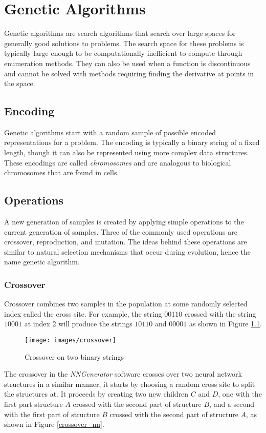 \chapter[Genetic Algorithms]{Genetic Algorithms}
Genetic algorithms are search algorithms that search over large spaces for generally good solutions to problems.
The search space for these problems is typically large enough to be computationally inefficient to compute through enumeration methods.
They can also be used when a function is discontinuous and cannot be solved with methods requiring finding the derivative at points in the space. 

\section{Encoding}
Genetic algorithms start with a random sample of possible encoded representations for a problem.
The encoding is typically a binary string of a fixed length, though it can also be represented using more complex data structures.
These encodings are called {\it chromosomes} and are analogous to biological chromosomes that are found in cells.

\section{Operations}
A new generation of samples is created by applying simple operations to the current generation of samples. 
Three of the commonly used operations are crossover, reproduction, and mutation.
The ideas behind these operations are similar to natural selection mechanisms that occur during evolution, hence the name genetic algorithm. 

\subsection{Crossover}
Crossover combines two samples in the population at some randomly selected index called the cross site. 
For example, the string $00110$ crossed with the string $10001$ at index 2 will produce the strings $10110$ and $00001$ as shown in Figure \ref{crossover}.

\begin{figure}[h!]
  \centering
  \texttt{[image: images/crossover]}
  \caption{Crossover on two binary strings}
  \label{crossover}
\end{figure}

The crossover in the {\it NNGenerator} software crosses over two
neural network structures in a similar manner, it starts by choosing a
random cross site to split the structures at.
It proceeds by creating two new children $C$ and $D$, one with the first part
structure $A$ crossed with the second part of structure $B$, and a
second with the first part of structure $B$ crossed with the second
part of structure $A$, as shown in Figure \ref{crossover_nn}.

